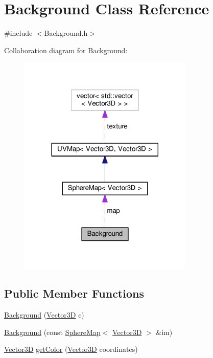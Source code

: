 \hypertarget{classBackground}{}\section{Background Class Reference}
\label{classBackground}


{\ttfamily \#include $<$Background.\+h$>$}



Collaboration diagram for Background\+:\nopagebreak
\begin{figure}[H]
\begin{center}
\leavevmode
\includegraphics[width=236pt]{classBackground__coll__graph}
\end{center}
\end{figure}
\subsection*{Public Member Functions}
\begin{DoxyCompactItemize}
\item 
\hyperlink{classBackground_a153fe3ce08c90c24e7d08862952a6244}{Background} (\hyperlink{classVector3D}{Vector3D} c)
\item 
\hyperlink{classBackground_a46cb4a8649d0d0535c916eea458c25de}{Background} (const \hyperlink{classSphereMap}{Sphere\+Map}$<$ \hyperlink{classVector3D}{Vector3D} $>$ \&im)
\item 
\hyperlink{classVector3D}{Vector3D} \hyperlink{classBackground_a901242466450821f487a1967d94c6506}{get\+Color} (\hyperlink{classVector3D}{Vector3D} coordinates)
\end{DoxyCompactItemize}
